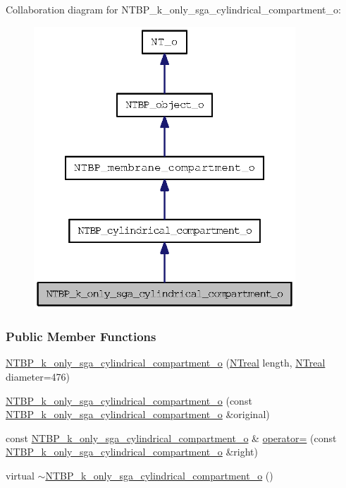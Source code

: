 Collaboration diagram for NTBP\_\-k\_\-only\_\-sga\_\-cylindrical\_\-compartment\_\-o:
\nopagebreak
\begin{figure}[H]
\begin{center}
\leavevmode
\includegraphics[width=278pt]{class_n_t_b_p__k__only__sga__cylindrical__compartment__o__coll__graph}
\end{center}
\end{figure}
\subsubsection*{Public Member Functions}
\begin{DoxyCompactItemize}
\item 
\hyperlink{class_n_t_b_p__k__only__sga__cylindrical__compartment__o_a0d0d47b4e67fee71126fced4a27efe5e}{NTBP\_\-k\_\-only\_\-sga\_\-cylindrical\_\-compartment\_\-o} (\hyperlink{nt__types_8h_a814a97893e9deb1eedcc7604529ba80d}{NTreal} length, \hyperlink{nt__types_8h_a814a97893e9deb1eedcc7604529ba80d}{NTreal} diameter=476)
\item 
\hyperlink{class_n_t_b_p__k__only__sga__cylindrical__compartment__o_a9efe1a86291137da08b0f8499584750a}{NTBP\_\-k\_\-only\_\-sga\_\-cylindrical\_\-compartment\_\-o} (const \hyperlink{class_n_t_b_p__k__only__sga__cylindrical__compartment__o}{NTBP\_\-k\_\-only\_\-sga\_\-cylindrical\_\-compartment\_\-o} \&original)
\item 
const \hyperlink{class_n_t_b_p__k__only__sga__cylindrical__compartment__o}{NTBP\_\-k\_\-only\_\-sga\_\-cylindrical\_\-compartment\_\-o} \& \hyperlink{class_n_t_b_p__k__only__sga__cylindrical__compartment__o_aafecfeb1d5e80fe6b57f4e3fe7b53b2d}{operator=} (const \hyperlink{class_n_t_b_p__k__only__sga__cylindrical__compartment__o}{NTBP\_\-k\_\-only\_\-sga\_\-cylindrical\_\-compartment\_\-o} \&right)
\item 
virtual \hyperlink{class_n_t_b_p__k__only__sga__cylindrical__compartment__o_a4af4caf40d60d917915cbaad532e88b8}{$\sim$NTBP\_\-k\_\-only\_\-sga\_\-cylindrical\_\-compartment\_\-o} ()
\end{DoxyCompactItemize}


